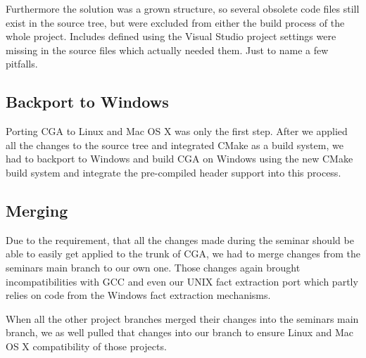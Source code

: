 Furthermore the solution was a grown structure, so several obsolete code files still exist in the source tree, but were excluded from either the build process of the whole project.  Includes defined using the Visual Studio project settings were missing in the source files which actually needed them. Just to name a few pitfalls.

\subsection{Backport to Windows}

Porting CGA to Linux and Mac OS X was only the first step. After we applied all the changes to the source tree and integrated CMake as a build system, we had to backport to Windows and build CGA on Windows using the new CMake build system  and integrate the pre-compiled header support into this process.

\subsection{Merging}

Due to the requirement, that all the changes made during the seminar should be able to easily get applied to the trunk of CGA, we had to merge changes from the seminars main branch to our own one. Those changes again brought incompatibilities with GCC and even our UNIX fact extraction port which partly relies on code from the Windows fact extraction mechanisms.

When all the other project branches merged their changes into the seminars main branch, we as well pulled that changes into our branch to ensure Linux and Mac OS X compatibility of those projects.
